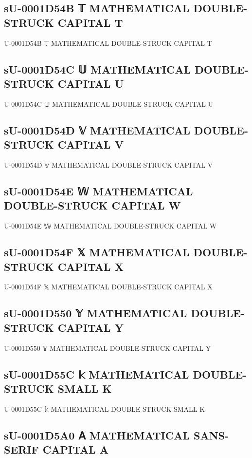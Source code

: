 \subsection{sU-0001D54B 𝕋 MATHEMATICAL DOUBLE-STRUCK CAPITAL T}

U-0001D54B 𝕋 MATHEMATICAL DOUBLE-STRUCK CAPITAL T

\subsection{sU-0001D54C 𝕌 MATHEMATICAL DOUBLE-STRUCK CAPITAL U}

U-0001D54C 𝕌 MATHEMATICAL DOUBLE-STRUCK CAPITAL U

\subsection{sU-0001D54D 𝕍 MATHEMATICAL DOUBLE-STRUCK CAPITAL V}

U-0001D54D 𝕍 MATHEMATICAL DOUBLE-STRUCK CAPITAL V

\subsection{sU-0001D54E 𝕎 MATHEMATICAL DOUBLE-STRUCK CAPITAL W}

U-0001D54E 𝕎 MATHEMATICAL DOUBLE-STRUCK CAPITAL W

\subsection{sU-0001D54F 𝕏 MATHEMATICAL DOUBLE-STRUCK CAPITAL X}

U-0001D54F 𝕏 MATHEMATICAL DOUBLE-STRUCK CAPITAL X

\subsection{sU-0001D550 𝕐 MATHEMATICAL DOUBLE-STRUCK CAPITAL Y}

U-0001D550 𝕐 MATHEMATICAL DOUBLE-STRUCK CAPITAL Y

\subsection{sU-0001D55C 𝕜 MATHEMATICAL DOUBLE-STRUCK SMALL K}

U-0001D55C 𝕜 MATHEMATICAL DOUBLE-STRUCK SMALL K

\subsection{sU-0001D5A0 𝖠 MATHEMATICAL SANS-SERIF CAPITAL A}


